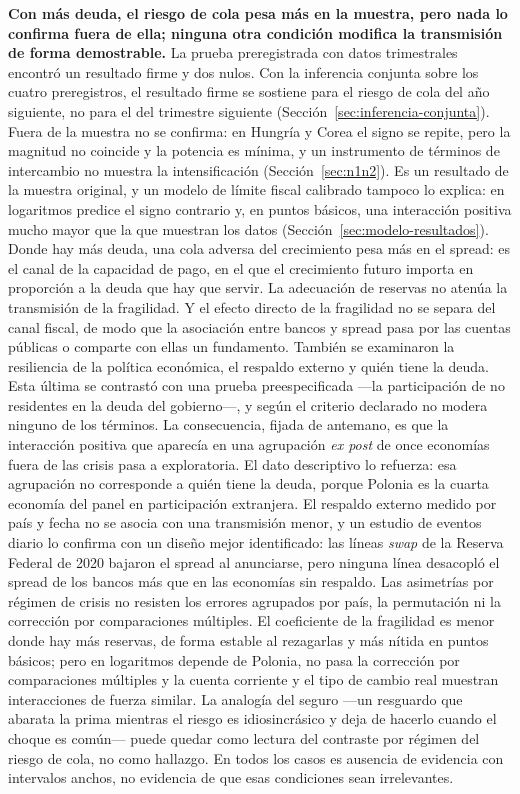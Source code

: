 \textbf{Con más deuda, el riesgo de cola pesa más en la muestra, pero nada lo confirma fuera de ella; ninguna otra condición modifica la transmisión de forma demostrable.} La prueba preregistrada con datos trimestrales encontró un resultado firme y dos nulos. Con la inferencia conjunta sobre los cuatro preregistros, el resultado firme se sostiene para el riesgo de cola del año siguiente, no para el del trimestre siguiente (Sección~\ref{sec:inferencia-conjunta}). Fuera de la muestra no se confirma: en Hungría y Corea el signo se repite, pero la magnitud no coincide y la potencia es mínima, y un instrumento de términos de intercambio no muestra la intensificación (Sección~\ref{sec:n1n2}). Es un resultado de la muestra original, y un modelo de límite fiscal calibrado tampoco lo explica: en logaritmos predice el signo contrario y, en puntos básicos, una interacción positiva mucho mayor que la que muestran los datos (Sección~\ref{sec:modelo-resultados}). Donde hay más deuda, una cola adversa del crecimiento pesa más en el spread: es el canal de la capacidad de pago, en el que el crecimiento futuro importa en proporción a la deuda que hay que servir. La adecuación de reservas no atenúa la transmisión de la fragilidad. Y el efecto directo de la fragilidad no se separa del canal fiscal, de modo que la asociación entre bancos y spread pasa por las cuentas públicas o comparte con ellas un fundamento. También se examinaron la resiliencia de la política económica, el respaldo externo y quién tiene la deuda. Esta última se contrastó con una prueba preespecificada ---la participación de no residentes en la deuda del gobierno---, y según el criterio declarado no modera ninguno de los términos. La consecuencia, fijada de antemano, es que la interacción positiva que aparecía en una agrupación \textit{ex post} de once economías fuera de las crisis pasa a exploratoria. El dato descriptivo lo refuerza: esa agrupación no corresponde a quién tiene la deuda, porque Polonia es la cuarta economía del panel en participación extranjera. El respaldo externo medido por país y fecha no se asocia con una transmisión menor, y un estudio de eventos diario lo confirma con un diseño mejor identificado: las líneas \textit{swap} de la Reserva Federal de 2020 bajaron el spread al anunciarse, pero ninguna línea desacopló el spread de los bancos más que en las economías sin respaldo. Las asimetrías por régimen de crisis no resisten los errores agrupados por país, la permutación ni la corrección por comparaciones múltiples. El coeficiente de la fragilidad es menor donde hay más reservas, de forma estable al rezagarlas y más nítida en puntos básicos; pero en logaritmos depende de Polonia, no pasa la corrección por comparaciones múltiples y la cuenta corriente y el tipo de cambio real muestran interacciones de fuerza similar. La analogía del seguro ---un resguardo que abarata la prima mientras el riesgo es idiosincrásico y deja de hacerlo cuando el choque es común--- puede quedar como lectura del contraste por régimen del riesgo de cola, no como hallazgo. En todos los casos es ausencia de evidencia con intervalos anchos, no evidencia de que esas condiciones sean irrelevantes.

